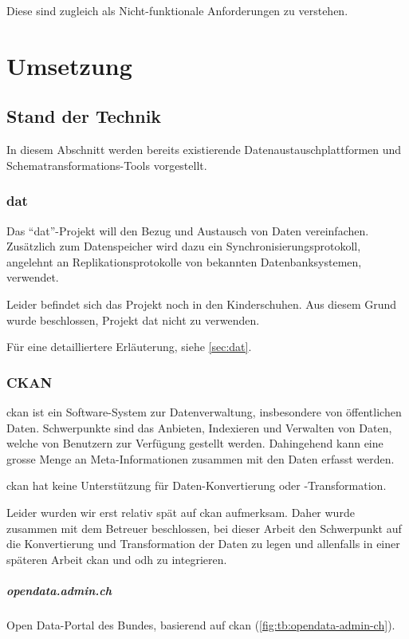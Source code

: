 Diese sind zugleich als Nicht-funktionale Anforderungen zu verstehen.

\chapter{Umsetzung}

\section{Stand der Technik} \label{sec:tb:state-of-the-art}

In diesem Abschnitt werden bereits existierende Datenaustauschplattformen und Schematransformations-Tools vorgestellt.

\subsection{dat}
Das ``dat''-Projekt will den Bezug und Austausch von Daten vereinfachen. Zusätzlich zum Datenspeicher wird dazu ein Synchronisierungsprotokoll, angelehnt an Replikationsprotokolle von bekannten Datenbanksystemen, verwendet.

Leider befindet sich das Projekt noch in den Kinderschuhen. Aus diesem Grund wurde beschlossen, Projekt dat nicht zu verwenden.

Für eine detailliertere Erläuterung, siehe \cref{sec:dat}.

\subsection{CKAN}
\gls{ckan} ist ein Software-System zur Datenverwaltung, insbesondere von öffentlichen Daten. Schwerpunkte sind das Anbieten, Indexieren und Verwalten von Daten, welche von Benutzern zur Verfügung gestellt werden. Dahingehend kann eine grosse Menge an Meta-Informationen zusammen mit den Daten erfasst werden. 

\gls{ckan} hat keine Unterstützung für Daten-Konvertierung oder -Transformation.

Leider wurden wir erst relativ spät auf \gls{ckan} aufmerksam. Daher wurde zusammen mit dem Betreuer beschlossen, bei dieser Arbeit den Schwerpunkt auf die Konvertierung und Transformation der Daten zu legen und allenfalls in einer späteren Arbeit \gls{ckan} und \acl{odh} zu integrieren.

\paragraph{opendata.admin.ch}
Open Data-Portal des Bundes, basierend auf \gls{ckan} (\cref{fig:tb:opendata-admin-ch}).

